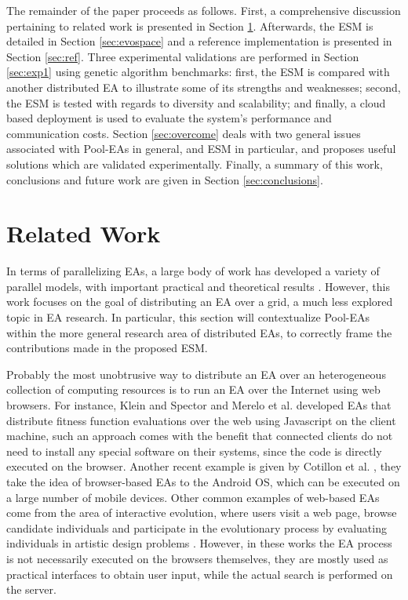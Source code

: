 The remainder of the paper proceeds as follows.
First, a comprehensive discussion pertaining to related work is presented in Section \ref{sec:related}.
Afterwards, the ESM is detailed in Section \ref{sec:evospace} and a reference implementation is presented in Section \ref{sec:ref}.
Three experimental validations are performed in Section \ref{sec:exp1} using genetic algorithm benchmarks:
first, the ESM is compared with another distributed EA to illustrate some of its
strengths and weaknesses; second, the ESM is tested with regards to diversity and scalability;
and finally, a cloud based deployment is used to evaluate the system's performance and communication costs.
Section \ref{sec:overcome} deals with two general issues associated with Pool-EAs in general, and ESM in particular,
and proposes useful solutions which are validated experimentally.
Finally, a summary of this work, conclusions and future work are given in Section \ref{sec:conclusions}.
 

\section{Related Work}
\label{sec:related}
In terms of parallelizing EAs, a large body of work has developed a variety of parallel models, with
important practical and theoretical results \cite{parallelEA}.
However, this work focuses on the goal of distributing an EA over a grid, a much less explored topic in EA research.
In particular, this section will contextualize Pool-EAs within the more general research area of distributed EAs,
to correctly frame the contributions made in the proposed ESM.

Probably the most unobtrusive way to distribute an EA over an heterogeneous collection of computing resources is to run an EA over the Internet using web browsers.
For instance, Klein and Spector \cite{spector:2007} and Merelo et al. \cite{merelo:2008} developed EAs that distribute fitness function evaluations over the web using Javascript on the client machine, such an approach comes with the benefit that connected clients do not need to install any special software on their systems,
since the code is directly executed on the browser.
Another recent example is given by Cotillon et al. \cite{cotillon:2012}, they take the idea of browser-based EAs to the Android OS, which can be
executed on a large number of mobile devices.
Other common examples of web-based EAs come from the area of interactive evolution, where users visit a web page, browse candidate individuals
and participate in the evolutionary process by evaluating individuals in artistic design problems \cite{Musart,Fire,langdon:2004,picbreeder}.
However, in these works the EA process is not necessarily executed on the browsers themselves, they are mostly used as practical interfaces
to obtain user input, while the actual search is performed on the server.


